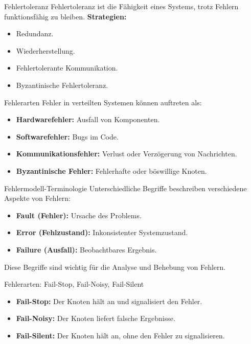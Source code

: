 \documentclass{beamer}
\begin{document}
\begin{frame}{Fehlertoleranz}
    Fehlertoleranz ist die Fähigkeit eines Systems, trotz Fehlern funktionsfähig zu bleiben. \newline
    \textbf{Strategien:}
    \begin{itemize}
        \item Redundanz.
        \item Wiederherstellung.
        \item Fehlertolerante Kommunikation.
        \item Byzantinische Fehlertoleranz.
    \end{itemize}
\end{frame}

\begin{frame}{Fehlerarten}
    Fehler in verteilten Systemen können auftreten als:
    \begin{itemize}
        \item \textbf{Hardwarefehler:} Ausfall von Komponenten.
        \item \textbf{Softwarefehler:} Bugs im Code.
        \item \textbf{Kommunikationsfehler:} Verlust oder Verzögerung von Nachrichten.
        \item \textbf{Byzantinische Fehler:} Fehlerhafte oder böswillige Knoten.
    \end{itemize}
\end{frame}

\begin{frame}{Fehlermodell-Terminologie}
    Unterschiedliche Begriffe beschreiben verschiedene Aspekte von Fehlern:
    \begin{itemize}
        \item \textbf{Fault (Fehler):} Ursache des Problems.
        \item \textbf{Error (Fehlzustand):} Inkonsistenter Systemzustand.
        \item \textbf{Failure (Ausfall):} Beobachtbares Ergebnis.
    \end{itemize}
    Diese Begriffe sind wichtig für die Analyse und Behebung von Fehlern.
\end{frame}

\begin{frame}{Fehlerarten: Fail-Stop, Fail-Noisy, Fail-Silent}
    \begin{itemize}
        \item \textbf{Fail-Stop:} Der Knoten hält an und signalisiert den Fehler.
        \item \textbf{Fail-Noisy:} Der Knoten liefert falsche Ergebnisse.
        \item \textbf{Fail-Silent:} Der Knoten hält an, ohne den Fehler zu signalisieren.
    \end{itemize}
\end{frame}
\end{document}

